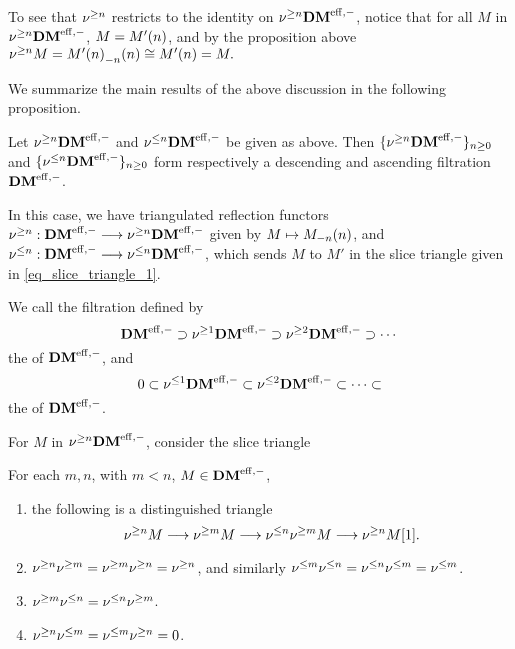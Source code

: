 To see that $\sgDM{n}$ restricts to the identity on $\sgDM{n} 
\DMeff$, notice that for all $M$ in $\sgDM{n} \DMeff$, $M = 
\tZ[n]{M'}$, and by the proposition above $\sgDM{n}M = 
\tZ[n]{\hZ[n]{\tZ[n]{M'}}} \cong \tZ[n]{M'} = M.$

We summarize the main results of the above discussion in the 
following proposition.

\begin{prop}\label{prop_slice_DMeff}
Let $\sgDM{n} \DMeff$ and $\slDM{n} \DMeff$ be given as above.
Then $\{\sgDM{n} \DMeff\}_{n \geq 0}$ and $\{\slDM{n} \DMeff\}_{n 
\geq 0}$ form respectively a descending and ascending filtration
$\DMeff$.

In this case, we have triangulated reflection functors $\sgDM{n}: 
\DMeff \to \sgDM{n}\DMeff$ given by $M \mapsto \tZ[n]{\hZ[n]{M}}$, 
and $\slDM{n}: \DMeff \to \slDM{n}\DMeff$, which sends $M$ to $M'$
in the slice triangle given in \eqref{eq_slice_triangle_1}.
\end{prop}

\begin{defn}
We call the filtration defined by
\[
\DMeff \supset \sgDM{1}\DMeff \supset \sgDM{2}\DMeff \supset \cdots \\
\]
the  of $\DMeff$, and
\[
0 \subset \slDM{1}\DMeff \subset \slDM{2}\DMeff \subset \cdots \subset
\]
the  of $\DMeff$.
\end{defn}

For $M$ in $\sgDM{n} \DMeff$, consider the slice triangle

\begin{prop}
For each $m, n$, with $m < n$, $M \in \DMeff$,

\begin{enumerate}
\item the following is a distinguished triangle
\begin{equation}
\sgDM{n}M \to \sgDM{m}M \to \slDM{n}\sgDM{m}M \to \sgDM{n}M[1].
\end{equation}

\item $\sgDM{n}\sgDM{m} = \sgDM{m}\sgDM{n} = \sgDM{n}$, and 
similarly $\slDM{m}\slDM{n} = \slDM{n}\slDM{m} = \slDM{m}$.

\item $\sgDM{m}\slDM{n} = \slDM{n}\sgDM{m}$.

\item $\sgDM{n}\slDM{m} = \slDM{m}\sgDM{n} = 0$.
\end{enumerate}
\end{prop}


